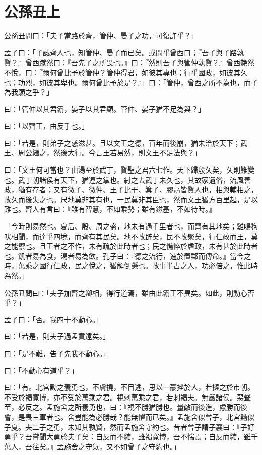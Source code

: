 \documentclass[12pt,a4paper]{ctexbook}
\begin{document}
\section{公孫丑上}
公孫丑問曰：「夫子當路於齊，管仲、晏子之功，可復許乎？」\par
孟子曰：「子誠齊人也，知管仲、晏子而已矣。或問乎曾西曰；『吾子與子路孰賢？』曾西蹴然曰：『吾先子之所畏也。』曰：『然則吾子與管仲孰賢？』曾西艴然不悅，曰：『爾何曾比予於管仲？管仲得君，如彼其專也；行乎國政，如彼其久也；功烈，如彼其卑也。爾何曾比予於是？』」曰：「管仲，曾西之所不為也，而子為我願之乎？」\par
曰：「管仲以其君霸，晏子以其君顯。管仲、晏子猶不足為與？」\par
曰：「以齊王，由反手也。」\par
曰：「若是，則弟子之惑滋甚。且以文王之德，百年而後崩，猶未洽於天下；武王、周公繼之，然後大行。今言王若易然，則文王不足法與？」\par
曰：「文王何可當也？由湯至於武丁，賢聖之君六七作。天下歸殷久矣，久則難變也。武丁朝諸侯有天下，猶運之掌也。紂之去武丁未久也，其故家遺俗，流風善政，猶有存者；又有微子、微仲、王子比干、箕子、膠鬲皆賢人也，相與輔相之，故久而後失之也。尺地莫非其有也，一民莫非其臣也，然而文王猶方百里起，是以難也。齊人有言曰：『雖有智慧，不如乘勢；雖有鎡基，不如待時。』\par
「今時則易然也。夏后、殷、周之盛，地未有過千里者也，而齊有其地矣；雞鳴狗吠相聞，而達乎四境，而齊有其民矣。地不改辟矣，民不改聚矣，行仁政而王，莫之能禦也。且王者之不作，未有疏於此時者也；民之憔悴於虐政，未有甚於此時者也。飢者易為食，渴者易為飲。孔子曰：『德之流行，速於置郵而傳命。』當今之時，萬乘之國行仁政，民之悅之，猶解倒懸也。故事半古之人，功必倍之，惟此時為然。」\par
公孫丑問曰：「夫子加齊之卿相，得行道焉，雖由此霸王不異矣。如此，則動心否乎？」\par
孟子曰：「否。我四十不動心。」\par
曰：「若是，則夫子過孟賁遠矣。」\par
曰：「是不難，告子先我不動心。」\par
曰：「不動心有道乎？」\par
曰：「有。北宮黝之養勇也，不膚撓，不目逃，思以一豪挫於人，若撻之於市朝。不受於褐寬博，亦不受於萬乘之君。視刺萬乘之君，若刺褐夫。無嚴諸侯。惡聲至，必反之。孟施舍之所養勇也，曰：『視不勝猶勝也。量敵而後進，慮勝而後會，是畏三軍者也。舍豈能為必勝哉？能無懼而已矣。』孟施舍似曾子，北宮黝似子夏。夫二子之勇，未知其孰賢，然而孟施舍守約也。昔者曾子謂子襄曰：『子好勇乎？吾嘗聞大勇於夫子矣：自反而不縮，雖褐寬博，吾不惴焉；自反而縮，雖千萬人，吾往矣。』孟施舍之守氣，又不如曾子之守約也。」\par
\end{document}
